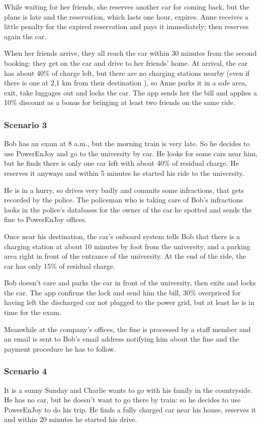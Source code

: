\documentclass[11pt]{article} %
\newcommand{\pe}{PowerEnJoy }
\begin{document}
While waiting for her friends, she reserves another car for coming back, but the plane is late and the reservation, which lasts one hour, expires. Anne receives a little penalty for the expired reservation and pays it immediately; then reserves again the car.

When her friends arrive, they all reach the car within 30 minutes from the second booking: they get on the car and drive to her friends' home. At arrival, the car has about 40\% of charge left, but there are no charging stations nearby (even if there is one at 2,1 km from their destination ), so Anne parks it in a safe area, exit, take luggages out and locks the car. The app sends her the bill and applies a 10\% discount as a bonus for bringing at least two friends on the same ride.


\subsubsection{Scenario 3}
Bob has an exam at 8 a.m., but the morning train is very late. So he decides to use \pe and go to the university by car. He looks for some cars near him, but he finds there is only one car left with about 40\% of residual charge. He reserves it anyways and within 5 minutes he started his ride to the university.

He is in a hurry, so drives very badly and commits some infractions, that gets recorded by the police. The policeman who is taking care of Bob's infractions looks in the police's databases for the owner of the car he spotted and sends the fine to \pe offices.

Once near his destination, the car's onboard system tells Bob that there is a charging station at about 10 minutes by foot from the university, and a parking area right in front of the entrance of the university. At the end of the ride, the car has only 15\% of residual charge.

Bob doesn't care and parks the car in front of the university, then exits and locks the car. The app confirms the lock and send him the bill, 30\% overpriced for having left the discharged car not plugged to the power grid, but at least he is in time for the exam.

Meanwhile at the company's offices, the fine is processed by a staff member and an email is sent to Bob's email address notifying him about the fine and the payment procedure he has to follow.


\subsubsection{Scenario 4}
It is a sunny Sunday and Charlie wants to go with his family in the countryside. He has no car, but he doesn't want to go there by train: so he decides to use \pe to do his trip. He finds a fully charged car near his house, reserves it and within 20 minutes he started his drive.
\end{document}
